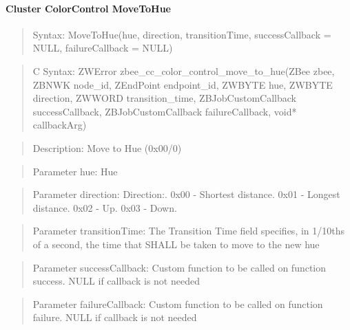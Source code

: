 \paragraph{Cluster ColorControl MoveToHue}
\begin{quote}Syntax: MoveToHue(hue, direction, transitionTime, successCallback = NULL, failureCallback = NULL)\end{quote}
\begin{quote}C Syntax: ZWError zbee\_cc\_color\_control\_move\_to\_hue(ZBee zbee, ZBNWK node\_id, ZEndPoint endpoint\_id, ZWBYTE hue, ZWBYTE direction, ZWWORD transition\_time, ZBJobCustomCallback successCallback, ZBJobCustomCallback failureCallback, void* callbackArg)\end{quote}
\begin{quote}Description: Move to Hue (0x00/0)\end{quote}
\begin{quote}Parameter hue: Hue\end{quote}
\begin{quote}Parameter direction: Direction:. 0x00 - Shortest distance. 0x01 - Longest distance. 0x02 - Up. 0x03 - Down. \end{quote}
\begin{quote}Parameter transitionTime: The Transition Time field specifies, in 1/10ths of a second, the time that SHALL be taken to move to the new hue\end{quote}
\begin{quote}Parameter successCallback: Custom function to be called on function success. NULL if callback is not needed\end{quote}
\begin{quote}Parameter failureCallback: Custom function to be called on function failure. NULL if callback is not needed\end{quote}


